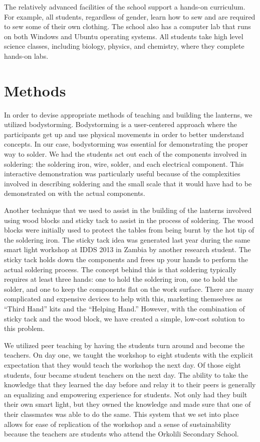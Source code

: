 \documentclass[11pt, twocolumn]{article}
\begin{document}
The relatively advanced facilities of the school support a hands-on curriculum. For example, all students, regardless of gender, learn how to sew and are required to sew some of their own clothing. The school also has a computer lab that runs on both Windows and Ubuntu operating systems. All students take high level science classes, including biology, physics, and chemistry, where they complete hands-on labs.

\section*{Methods}
In order to devise appropriate methods of teaching and building the lanterns, we utilized bodystorming. Bodystorming is a user-centered approach where the participants get up and use physical movements in order to better understand concepts. In our case, bodystorming was essential for demonstrating the proper way to solder. We had the students act out each of the components involved in soldering: the soldering iron, wire, solder, and each electrical component. This interactive demonstration was particularly useful because of the complexities involved in describing soldering and the small scale that it would have had to be demonstrated on with the actual components.

Another technique that we used to assist in the building of the lanterns involved using wood blocks and sticky tack to assist in the process of soldering. The wood blocks were initially used to protect the tables from being burnt by the hot tip of the soldering iron. The sticky tack idea was generated last year during the same smart light workshop at IDDS 2013 in Zambia by another research student. The sticky tack holds down the components and frees up your hands to perform the actual soldering process. The concept behind this is that soldering typically requires at least three hands: one to hold the soldering iron, one to hold the solder, and one to keep the components flat on the work surface. There are many complicated and expensive devices to help with this, marketing themselves as “Third Hand” kits and the “Helping Hand.” However, with the combination of sticky tack and the wood block, we have created a simple, low-cost solution to this problem.

We utilized peer teaching by having the students turn around and become the teachers.  On day one, we taught the workshop to eight students with the explicit expectation that they would teach the workshop the next day. Of those eight students, four became student teachers on the next day. The ability to take the knowledge that they learned the day before and relay it to their peers is generally an equalizing and empowering experience for students. Not only had they built their own smart light, but they owned the knowledge and made sure that one of their classmates was able to do the same. This system that we set into place allows for ease of replication of the workshop and a sense of sustainability because the teachers are students who attend the Orkolili Secondary School.
\end{document}
